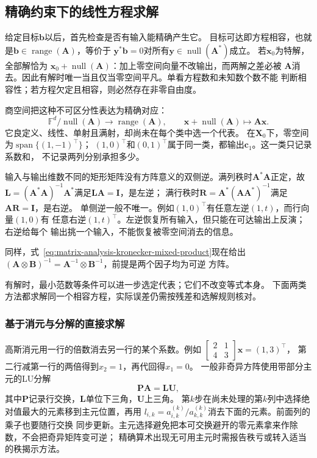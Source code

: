 \subsection{精确约束下的线性方程求解}
\label{sec:linear-algebra-exact-systems}

给定目标$\bm b$以后，首先检查是否有输入能精确产生它。
目标可达即方程相容，也就是$\bm b\in\operatorname{range}(\bm A)$，等价于
$\bm y^*\bm b=0$对所有$\bm y\in\operatorname{null}(\bm A^*)$成立。
若$\bm x_0$为特解，全部解恰为
$\bm x_0+\operatorname{null}(\bm A)$：加上零空间向量不改输出，而两解之差必被
$\bm A$消去。因此有解时唯一当且仅当零空间平凡。单看方程数和未知数个数不能
判断相容性；若方程欠定且相容，则必然存在非零自由度。

商空间把这种不可区分性表达为精确对应：
\[
 \mathbb F^d/\operatorname{null}(\bm A)
 \longrightarrow\operatorname{range}(\bm A),\qquad
 \bm x+\operatorname{null}(\bm A)\longmapsto\bm A\bm x.
\]
它良定义、线性、单射且满射，却尚未在每个类中选一个代表。
在$\bm X_0$下，零空间为$\operatorname{span}\{(1,-1)^\top\}$；
$(1,0)^\top$和$(0,1)^\top$属于同一类，都输出$\bm c_1$。这一类只记录系数和，
不记录两列分别承担多少。


输入与输出维数不同的矩形矩阵没有方阵意义的双侧逆。满列秩时$\bm A^*\bm A$正定，故
$\bm L=(\bm A^*\bm A)^{-1}\bm A^*$满足$\bm L\bm A=\bm I$，是左逆；
满行秩时$\bm R=\bm A^*(\bm A\bm A^*)^{-1}$满足$\bm A\bm R=\bm I$，是右逆。
单侧逆一般不唯一。例如$(1,0)^\top$有任意左逆$(1,t)$，而行向量$(1,0)$有
任意右逆$(1,t)^\top$。左逆恢复所有输入，但只能在可达输出上反演；右逆给每个
输出挑一个输入，不能恢复被零空间消去的信息。


同样，式~\eqref{eq:matrix-analysis-kronecker-mixed-product}现在给出
$(\bm A\otimes\bm B)^{-1}=\bm A^{-1}\otimes\bm B^{-1}$，前提是两个因子均为可逆
方阵。


有解时，最小范数等条件可以进一步选定代表；它们不改变等式本身。
下面两类方法都求解同一个相容方程，实际误差仍需按残差和选解规则核对。

\subsubsection{基于消元与分解的直接求解}
\label{sec:linear-algebra-direct-exact}
\label{sec:matrix-analysis-stable-solvers}

\label{sec:matrix-analysis-blocks-updates}


高斯消元用一行的倍数消去另一行的某个系数。例如
$\left[\begin{smallmatrix}2&1\\4&3\end{smallmatrix}\right]\bm x=(1,3)^\top$，
第二行减第一行的两倍得到$x_2=1$，再代回得$x_1=0$。
一般非奇异方阵使用带部分主元的LU分解
\begin{equation}
 \bm P\bm A=\bm L\bm U,
 \label{eq:matrix-analysis-palu}
\end{equation}
其中$\bm P$记录行交换，$\bm L$单位下三角，$\bm U$上三角。
第$k$步在尚未处理的第$k$列中选择绝对值最大的元素移到主元位置，再用
$l_{i,k}=a^{(k)}_{i,k}/a^{(k)}_{k,k}$消去下面的元素。前面列的乘子也要随行交换
同步更新。主元选择避免把本可交换避开的零元素拿来作除数，不会把奇异矩阵变可逆；
精确算术出现无可用主元时需报告秩亏或转入适当的秩揭示方法。

